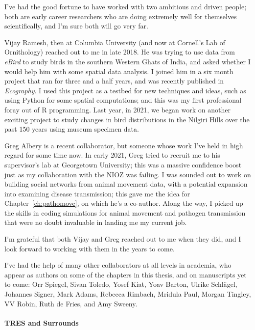 \medskip

I've had the good fortune to have worked with two ambitious and driven people; both are early career researchers who are doing extremely well for themselves scientifically, and I'm sure both will go very far.

\noindent Vijay Ramesh, then at Columbia University (and now at Cornell's Lab of Ornithology) reached out to me in late 2018.
He was trying to use data from \textit{eBird} to study birds in the southern Western Ghats of India, and asked whether I would help him with some spatial data analysis.
I joined him in a six month project that ran for three and a half years, and was recently published in \textit{Ecography}.
I used this project as a testbed for new techniques and ideas, such as using Python for some spatial computations; and this was my first professional foray out of R programming.
Last year, in 2021, we began work on another exciting project to study changes in bird distributions in the Nilgiri Hills over the past 150 years using museum specimen data.

\noindent Greg Albery is a recent collaborator, but someone whose work I've held in high regard for some time now.
In early 2021, Greg tried to recruit me to his supervisor's lab at Georgetown University; this was a massive confidence boost just as my collaboration with the NIOZ was failing.
I was sounded out to work on building social networks from animal movement data, with a potential expansion into examining disease transmission; this gave me the idea for Chapter~\ref{ch:pathomove}, on which he's a co-author.
Along the way, I picked up the skills in coding simulations for animal movement and pathogen transmission that were no doubt invaluable in landing me my current job.

\noindent I'm grateful that both Vijay and Greg reached out to me when they did, and I look forward to working with them in the years to come.

\noindent I've had the help of many other collaborators at all levels in academia, who appear as authors on some of the chapters in this thesis, and on manuscripts yet to come: Orr Spiegel, Sivan Toledo, Yosef Kiat, Yoav Barton, Ulrike Schl{\"a}gel, Johannes Signer, Mark Adams, Rebecca Rimbach, Mridula Paul, Morgan Tingley, VV Robin, Ruth de Fries, and Amy Sweeny.

\paragraph*{TRES and Surrounds}

